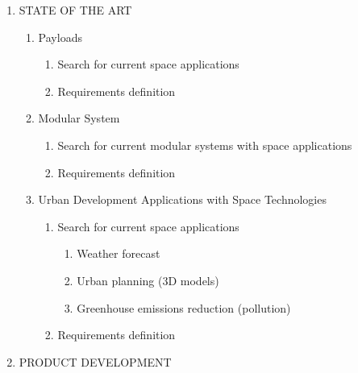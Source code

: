 \begin{enumerate}[label*=\arabic*.]
	\item STATE OF THE ART
	
	\begin{enumerate}[label*=\arabic*.]
		\item Payloads
		\begin{enumerate}[label*=\arabic*.]
			\item Search for current space applications
			\item Requirements definition
		\end{enumerate}
		\item Modular System
		\begin{enumerate}[label*=\arabic*.]
			\item Search for current modular systems with space applications
			\item Requirements definition
		\end{enumerate}
		\item Urban Development Applications with Space Technologies
		\begin{enumerate}[label*=\arabic*.]
			\item Search for current space applications
			\begin{enumerate}[label*=\arabic*.]
				\item Weather forecast
				\item Urban planning (3D models)
				\item Greenhouse emissions reduction (pollution)
			\end{enumerate}
			\item Requirements definition
		\end{enumerate}
	\end{enumerate}
	
	\item PRODUCT DEVELOPMENT
	

\end{enumerate}

